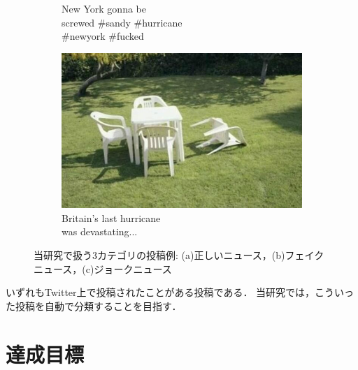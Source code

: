 \begin{figure}[h]
\begin{subfigure}{0.31\textwidth}
        \caption{New York gonna be\\screwed \#sandy \#hurricane\\\#newyork \#fucked}
        \label{fig:fake}
    \end{subfigure}
    \hspace*{\fill} %
    \begin{subfigure}{0.31\textwidth}
        \includegraphics[width=\linewidth]{images/humor_example.jpg}
        \caption{Britain's last hurricane\\was devastating...}
        \label{fig:humor}
    \end{subfigure}
    \caption{当研究で扱う3カテゴリの投稿例: (a)正しいニュース，(b)フェイクニュース，(c)ジョークニュース}
    \label{fig:examples}
\end{figure}

いずれもTwitter上で投稿されたことがある投稿である．
当研究では，こういった投稿を自動で分類することを目指す．
%
\section{達成目標}
%